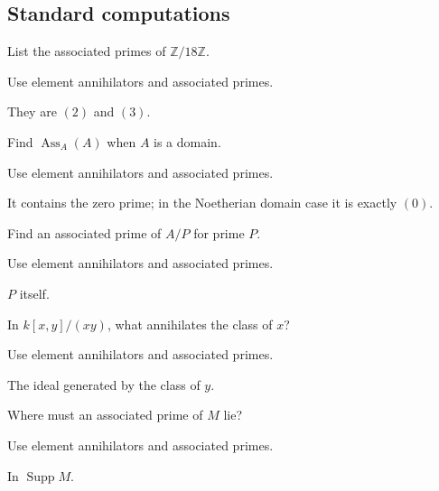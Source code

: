 \subsection*{Standard computations}

\begin{exercise}\label{exr:v17-expand-01}
List the associated primes of $\mathbb Z/18\mathbb Z$.
\end{exercise}
\begin{hint}
Use element annihilators and associated primes.
\end{hint}
\begin{solution}
They are $(2)$ and $(3)$.
\end{solution}

\begin{exercise}[Domain]\label{exr:v17-expand-02}
Find $\operatorname{Ass}_A(A)$ when $A$ is a domain.
\end{exercise}
\begin{hint}
Use element annihilators and associated primes.
\end{hint}
\begin{solution}
It contains the zero prime; in the Noetherian domain case it is exactly $(0)$.
\end{solution}

\begin{exercise}\label{exr:v17-expand-03}
Find an associated prime of $A/P$ for prime $P$.
\end{exercise}
\begin{hint}
Use element annihilators and associated primes.
\end{hint}
\begin{solution}
$P$ itself.
\end{solution}

\begin{exercise}\label{exr:v17-expand-04}
In $k[x,y]/(xy)$, what annihilates the class of $x$?
\end{exercise}
\begin{hint}
Use element annihilators and associated primes.
\end{hint}
\begin{solution}
The ideal generated by the class of $y$.
\end{solution}

\begin{exercise}\label{exr:v17-expand-05}
Where must an associated prime of $M$ lie?
\end{exercise}
\begin{hint}
Use element annihilators and associated primes.
\end{hint}
\begin{solution}
In $\operatorname{Supp}M$.
\end{solution}

